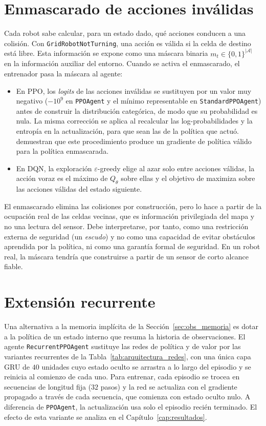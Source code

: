 \section{Enmascarado de acciones inválidas}\label{sec:action_masking}
Cada robot sabe calcular, para un estado dado, qué acciones conducen a
una colisión. Con \texttt{GridRobotNotTurning}, una acción es válida si
la celda de destino está libre. Esta información se expone como una
máscara binaria $m_t\in\{0,1\}^{|\mathcal{A}|}$ en la información
auxiliar del entorno. Cuando se activa el enmascarado, el entrenador
pasa la máscara al agente:
\begin{itemize}
    \item En PPO, los \textit{logits} de las acciones inválidas se
    sustituyen por un valor muy negativo ($-10^9$ en \texttt{PPOAgent} y
    el mínimo representable en \texttt{StandardPPOAgent}) antes de
    construir la distribución categórica, de modo que su probabilidad es
    nula. La misma corrección se aplica al recalcular las
    log-probabilidades y la entropía en la actualización, para que sean
    las de la política que actuó. \citet{huang2022closer} demuestran que
    este procedimiento produce un gradiente de política válido para la
    política enmascarada.
    \item En DQN, la exploración $\varepsilon$-greedy elige al azar solo
    entre acciones válidas, la acción voraz es el máximo de $Q_\theta$
    sobre ellas y el objetivo de  maximiza sobre las
    acciones válidas del estado siguiente.
\end{itemize}

El enmascarado elimina las colisiones por construcción, pero lo hace a
partir de la ocupación real de las celdas vecinas, que es información
privilegiada del mapa y no una lectura del sensor. Debe interpretarse,
por tanto, como una restricción externa de seguridad (un
\textit{escudo}) y no como una capacidad de evitar obstáculos aprendida
por la política, ni como una garantía formal de seguridad. En un robot
real, la máscara tendría que construirse a partir de un sensor de corto
alcance fiable.

\section{Extensión recurrente}\label{sec:ppo_lstm}
Una alternativa a la memoria implícita de la
Sección~\ref{sec:obs_memoria} es dotar a la política de un estado
interno que resuma la historia de observaciones. El agente
\texttt{RecurrentPPOAgent} sustituye las redes de política y de valor por
las variantes recurrentes de la Tabla~\ref{tab:arquitectura_redes}, con
una única capa GRU de $40$ unidades cuyo estado oculto se arrastra a lo
largo del episodio y se reinicia al comienzo de cada uno. Para entrenar,
cada episodio se trocea en secuencias de longitud fija ($32$ pasos) y la
red se actualiza con el gradiente propagado a través de cada secuencia,
que comienza con estado oculto nulo. A diferencia de \texttt{PPOAgent},
la actualización usa solo el episodio recién terminado. El efecto de esta
variante se analiza en el Capítulo~\ref{cap:resultados}.
